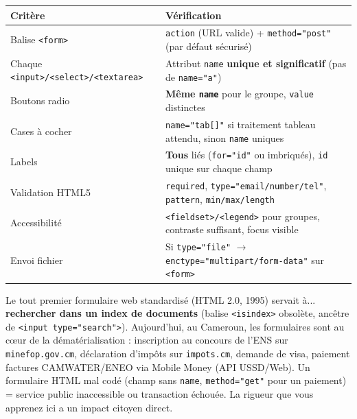 \documentclass[11pt]{article}
\begin{document}
\begin{center}
\begin{tabularx}{\linewidth}{|l|X|}\hline
\textbf{Critère} & \textbf{Vérification} \\\hline
Balise \texttt{<form>} & \texttt{action} (URL valide) + \texttt{method="post"} (par défaut sécurisé) \\\hline
Chaque \texttt{<input>/<select>/<textarea>} & Attribut \texttt{name} \textbf{unique et significatif} (pas de \texttt{name="a"}) \\\hline
Boutons radio & \textbf{Même \texttt{name}} pour le groupe, \texttt{value} distinctes \\\hline
Cases à cocher & \texttt{name="tab[]"} si traitement tableau attendu, sinon \texttt{name} uniques \\\hline
Labels & \textbf{Tous} liés (\texttt{for="id"} ou imbriqués), \texttt{id} unique sur chaque champ \\\hline
Validation HTML5 & \texttt{required}, \texttt{type="email/number/tel"}, \texttt{pattern}, \texttt{min/max/length} \\\hline
Accessibilité & \texttt{<fieldset>/<legend>} pour groupes, contraste suffisant, focus visible \\\hline
Envoi fichier & Si \texttt{type="file"} $\rightarrow$ \texttt{enctype="multipart/form-data"} sur \texttt{<form>} \\\hline
\end{tabularx}
\end{center}

\begin{savaistu}
Le tout premier formulaire web standardisé (HTML 2.0, 1995) servait à... \textbf{rechercher dans un index de documents} (balise \texttt{<isindex>} obsolète, ancêtre de \texttt{<input type="search">}). Aujourd'hui, au Cameroun, les formulaires sont au cœur de la dématérialisation : inscription au concours de l'ENS sur \texttt{minefop.gov.cm}, déclaration d'impôts sur \texttt{impots.cm}, demande de visa, paiement factures CAMWATER/ENEO via Mobile Money (API USSD/Web). Un formulaire HTML mal codé (champ sans \texttt{name}, \texttt{method="get"} pour un paiement) = service public inaccessible ou transaction échouée. La rigueur que vous apprenez ici a un impact citoyen direct.
\end{savaistu}
\end{document}
